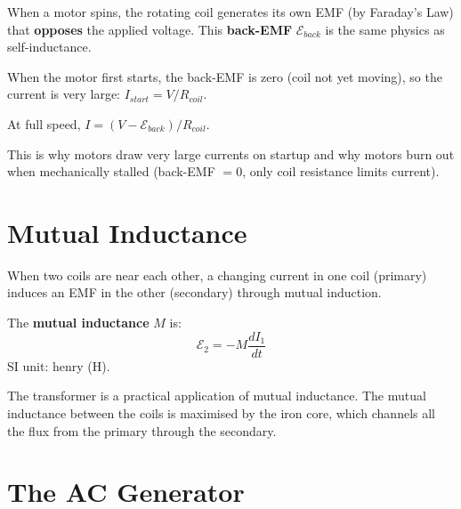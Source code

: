 \begin{keybox}
When a motor spins, the rotating coil generates its
own EMF (by Faraday's Law) that \textbf{opposes}
the applied voltage. This \textbf{back-EMF}
$\mathcal{E}_{back}$ is the same physics as
self-inductance.

When the motor first starts, the back-EMF is zero
(coil not yet moving), so the current is very large:
$I_{start} = V/R_{coil}$.

At full speed, $I = (V - \mathcal{E}_{back})/R_{coil}$.

This is why motors draw very large currents on
startup and why motors burn out when mechanically
stalled (back-EMF $= 0$, only coil resistance limits
current).
\end{keybox}

\section{Mutual Inductance}

\begin{definitionbox}
When two coils are near each other, a changing current
in one coil (primary) induces an EMF in the other
(secondary) through mutual induction.

The \textbf{mutual inductance} $M$ is:
\[
  \mathcal{E}_2 = -M\frac{dI_1}{dt}
\]
SI unit: henry (H).

The transformer is a practical application of mutual
inductance. The mutual inductance between the coils
is maximised by the iron core, which channels all
the flux from the primary through the secondary.
\end{definitionbox}

\section{The AC Generator}

